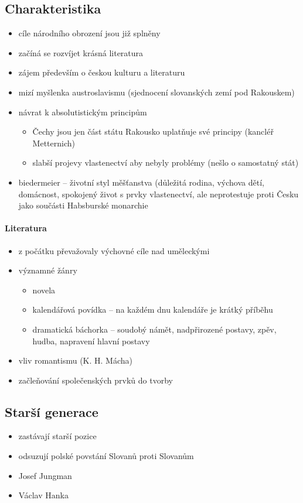 \subsection{Charakteristika}
\begin{itemize}
\item cíle národního obrození jsou již splněny
\item začíná se rozvíjet krásná literatura
\item zájem především o českou kulturu a literaturu
\item mizí myšlenka austroslavismu (sjednocení slovanských zemí pod Rakouskem)
\item návrat k absolutistickým principům
	\begin{itemize}
	\item Čechy jsou jen část státu \ra Rakousko uplatňuje své principy (kancléř Metternich)
	\item \ra slabší projevy vlastenectví aby nebyly problémy (nešlo o samostatný stát)
	\end{itemize}
	\item biedermeier -- životní styl měšťanstva (důležitá rodina, výchova dětí, domácnost, spokojený život s prvky vlastenectví, ale neprotestuje proti Česku jako součásti Habsburské monarchie
\end{itemize}

\paragraph{Literatura}
\begin{itemize}
\item z počátku převažovaly výchovné cíle nad uměleckými
\item významné žánry
	\begin{itemize}
	\item novela
	\item kalendářová povídka -- na každém dnu kalendáře je krátký příběhu
	\item dramatická báchorka -- soudobý námět, nadpřirozené postavy, zpěv, hudba, napravení hlavní postavy
	\end{itemize}
\item vliv romantismu (K. H. Mácha)
\item začleňování společenských prvků do tvorby
\end{itemize}

\subsection{Starší generace}
\begin{itemize}
\item zastávají starší pozice
\item odsuzují polské povstání Slovanů proti Slovanům
\item Josef Jungman
\item Václav Hanka
\end{itemize}

